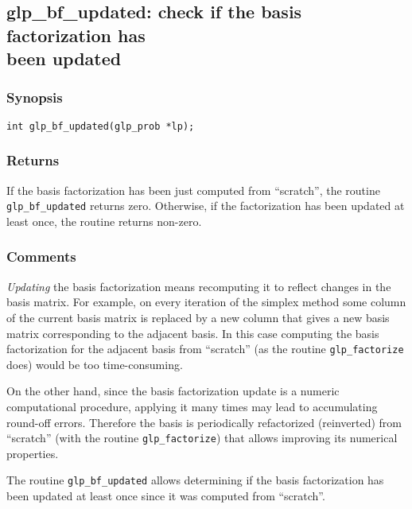 
\newpage

\subsection{glp\_bf\_updated: check if the basis factorization has\\
been updated}

\subsubsection*{Synopsis}

\begin{verbatim}
int glp_bf_updated(glp_prob *lp);
\end{verbatim}

\subsubsection*{Returns}

If the basis factorization has been just computed from ``scratch'', the
routine \verb|glp_bf_updated| returns zero. Otherwise, if the
factorization has been updated at least once, the routine returns
non-zero.

\subsubsection*{Comments}

{\it Updating} the basis factorization means recomputing it to reflect
changes in the basis matrix. For example, on every iteration of the
simplex method some column of the current basis matrix is replaced by a
new column that gives a new basis matrix corresponding to the adjacent
basis. In this case computing the basis factorization for the adjacent
basis from ``scratch'' (as the routine \verb|glp_factorize| does) would
be too time-consuming.

On the other hand, since the basis factorization update is a numeric
computational procedure, applying it many times may lead to accumulating
round-off errors. Therefore the basis is periodically refactorized
(reinverted) from ``scratch'' (with the routine \verb|glp_factorize|)
that allows improving its numerical properties.

The routine \verb|glp_bf_updated| allows determining if the basis
factorization has been updated at least once since it was computed from
``scratch''.

